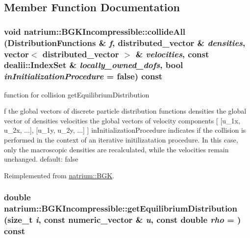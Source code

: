\subsection{Member Function Documentation}
\hypertarget{classnatrium_1_1BGKIncompressible_a53dc53b5ddb31a6ef67acd25abb405f1}{
\subsubsection[{collideAll}]{\setlength{\rightskip}{0pt plus 5cm}void natrium::BGKIncompressible::collideAll ({\bf DistributionFunctions} \& {\em f}, \/  {\bf distributed\_\-vector} \& {\em densities}, \/  vector$<$ {\bf distributed\_\-vector} $>$ \& {\em velocities}, \/  const dealii::IndexSet \& {\em locally\_\-owned\_\-dofs}, \/  bool {\em inInitializationProcedure} = {\ttfamily false}) const}}
\label{classnatrium_1_1BGKIncompressible_a53dc53b5ddb31a6ef67acd25abb405f1}


function for collision getEquilibriumDistribution

f the global vectors of discrete particle distribution functions densities the global vector of densities velocities the global vectors of velocity components \mbox{[} \mbox{[}u\_\-1x, u\_\-2x, ...\mbox{]}, \mbox{[}u\_\-1y, u\_\-2y, ...\mbox{]} \mbox{]} inInitializationProcedure indicates if the collision is performed in the context of an iterative initilizatation procedure. In this case, only the macroscopic densities are recalculated, while the velocities remain unchanged. default: false 

Reimplemented from \hyperlink{classnatrium_1_1BGK_a9fa1c980217a183fc4762954e86ba36d}{natrium::BGK}.\hypertarget{classnatrium_1_1BGKIncompressible_a26dd8954261b04f8383ca9d37f5ac8c0}{
\subsubsection[{getEquilibriumDistribution}]{\setlength{\rightskip}{0pt plus 5cm}double natrium::BGKIncompressible::getEquilibriumDistribution (size\_\-t {\em i}, \/  const {\bf numeric\_\-vector} \& {\em u}, \/  const double {\em rho} = {}) const}}
\label{classnatrium_1_1BGKIncompressible_a26dd8954261b04f8383ca9d37f5ac8c0}


